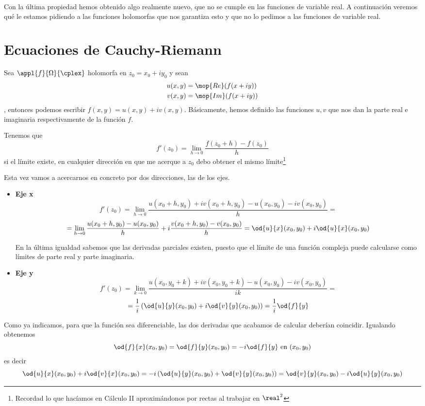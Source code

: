\documentclass{apuntes}
\begin{document}
Con la última propiedad hemos obtenido algo realmente nuevo, que no se cumple en las funciones de variable real. A continuación veremos qué le estamos pidiendo a las funciones holomorfas que nos garantiza esto y que no lo pedimos a las funciones de variable real.


\section{Ecuaciones de Cauchy-Riemann}
Sea $\appl{f}{\Omega}{\cplex}$ holomorfa en $z_0=x_0+iy_0$ y sean
\begin{align*}
u(x,y) &= \mop{Re}(f(x+iy)) \\
v(x,y) &= \mop{Im}(f(x+iy))
\end{align*}, entonces podemos escribir $f(x,y)=u(x,y)+iv(x,y)$. Básicamente, hemos definido las funciones $u,v$ que nos dan la parte real e imaginaria respectivamente de la función $f$.

Tenemos que
\[f'(z_0)=\lim_{h \to 0} \frac{f(z_0+h)-f(z_0)}{h}\]
si el límite existe, en cualquier dirección en que me acerque a $z_0$ debo obtener el mismo límite\footnote{Recordad lo que hacíamos en Cálculo II aproximándonos por rectas al trabajar en $\real^2$}

Esta vez vamos a acercarnos en concreto por dos direcciones, las de los ejes.
\begin{itemize}
\item \textbf{Eje x}
\[f'(z_0)=\lim_{h \to 0} \frac{u(x_0+h,y_0)+iv(x_0+h,y_0)-u(x_0, y_0)-iv(x_0,y_0)}{h}=\]
\[= \lim_{h \to 0}\frac{u(x_0+h,y_0)-u(x_0, y_0)}{h}+i\frac{v(x_0+h,y_0)-v(x_0,y_0)}{h}=\od{u}{x}(x_0,y_0)+i\od{u}{x}(x_0,y_0)\]

En la última igualdad sabemos que las derivadas parciales existen, puesto que el límite de una función compleja puede calcularse como límites de parte real y parte imaginaria.

\item \textbf{Eje y}
\[f'(z_0)=\lim_{k \to 0} \frac{u(x_0,y_0+k)+iv(x_0,y_0+k)-u(x_0, y_0)-iv(x_0,y_0)}{ik}=\]
\[=\frac{1}{i}\left(\od{u}{y}(x_0,y_0)+i \od{v}{y}(x_0, y_0)\right)=\frac{1}{i}\od{f}{y}\]
\end{itemize}

Como ya indicamos, para que la función sea diferenciable, las dos derivadas que acabamos de calcular deberían coincidir. Igualando obtenemos
\[\od{f}{x}(x_0,y_0)=\od{f}{y}(x_0,y_0) = -i \od{f}{y} \text{ en } (x_0,y_0)\]
es decir
\[\od{u}{x}(x_0,y_0)+i\od{v}{x}(x_0,y_0)=-i\left(\od{u}{y}(x_0,y_0)+\od{v}{y}(x_0,y_0)\right)=\od{v}{y}(x_0,y_0)-i\od{u}{y}(x_0,y_0)\]
\end{document}
